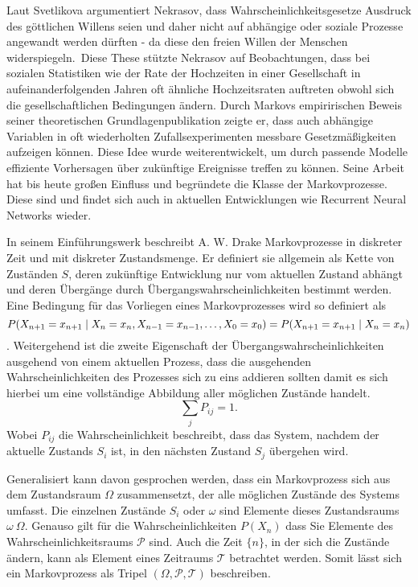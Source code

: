 Laut Svetlikova argumentiert Nekrasov, dass Wahrscheinlichkeitsgesetze Ausdruck des göttlichen Willens seien und daher nicht auf abhängige oder soziale Prozesse angewandt werden dürften - da diese den freien Willen der Menschen widerspiegeln.\citep{svetlikova2013nekrasov} Diese These stützte Nekrasov auf Beobachtungen, dass bei sozialen Statistiken wie der Rate der Hochzeiten in einer Gesellschaft in aufeinanderfolgenden Jahren oft ähnliche Hochzeitsraten auftreten obwohl sich die gesellschaftlichen Bedingungen ändern. \citep{nekrasov1912} Durch Markovs empiririschen Beweis seiner theoretischen Grundlagenpublikation \citet{markov1906extension} zeigte er, dass auch abhängige Variablen in oft wiederholten Zufallsexperimenten messbare Gesetzmäßigkeiten aufzeigen können.  Diese Idee wurde weiterentwickelt, um durch passende Modelle effiziente Vorhersagen über zukünftige Ereignisse treffen zu können.
Seine Arbeit hat bis heute großen Einfluss und begründete die Klasse der Markovprozesse. Diese sind und findet sich auch in aktuellen Entwicklungen wie Recurrent Neural Networks wieder.

In seinem Einführungswerk beschreibt A. W. Drake Markovprozesse in diskreter Zeit und mit diskreter Zustandsmenge. Er definiert sie allgemein als Kette von Zuständen $S$, deren zukünftige Entwicklung nur vom aktuellen Zustand abhängt und deren Übergänge durch Übergangswahrscheinlichkeiten bestimmt werden. Eine Bedingung für das Vorliegen eines Markovprozesses wird so definiert als \begin{equation}
P(X_{n+1} = x_{n+1} \mid X_n = x_n, X_{n-1} = \newline x_{n-1}, \dots, X_0 = x_0)
= P(X_{n+1} = x_{n+1} \mid X_n = x_n)
\label{eq:markov_property}
\end{equation}.
Weitergehend ist die zweite Eigenschaft der Übergangswahrscheinlichkeiten ausgehend von einem aktuellen Prozess, dass die ausgehenden Wahrscheinlichkeiten des Prozesses sich zu eins addieren sollten damit es sich hierbei um eine vollständige Abbildung aller möglichen Zustände handelt.
\begin{equation}
  \sum_j P_{ij} = 1.
\end{equation}
Wobei $P_{ij}$ die Wahrscheinlichkeit beschreibt, dass das System, nachdem der aktuelle Zustands $S_i$ ist, in den nächsten Zustand $S_j$ übergehen wird.\citet{drake88}

Generalisiert kann davon gesprochen werden, dass ein Markovprozess sich aus dem Zustandsraum $\Omega$ zusammensetzt, der alle möglichen Zustände des Systems umfasst. Die einzelnen Zustände $S_i$ oder $\omega$ sind Elemente dieses Zustandsraums $\omega~\Omega$. Genauso gilt für die Wahrscheinlichkeiten $P(X_{n})$ dass Sie Elemente des Wahrscheinlichkeitsraums $\mathcal{P}$ sind. Auch die Zeit $\{n\}$, in der sich die Zustände ändern, kann als Element eines Zeitraums $\mathcal{T}$ betrachtet werden. Somit lässt sich ein Markovprozess als Tripel $(\Omega, \mathcal{P}, \mathcal{T})$ beschreiben.

